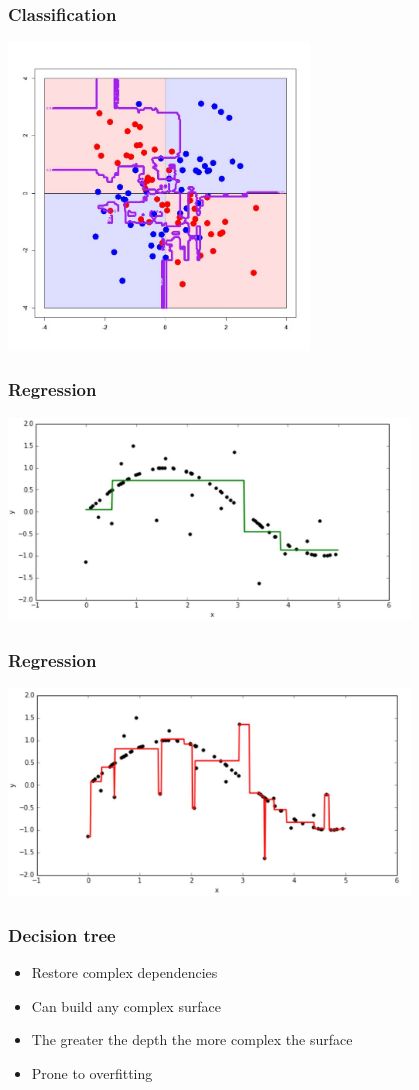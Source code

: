 \documentclass[default]{beamer}
\begin{document}
	\begin{frame}
		\frametitle{Classification}
		\centering
		\includegraphics[width=0.6\textwidth]{trees8.jpg}
	\end{frame}

	\begin{frame}
		\frametitle{Regression}
		\centering
		\includegraphics[width=0.8\textwidth]{trees9.jpg}
	\end{frame}

	\begin{frame}
		\frametitle{Regression}
		\centering
		\includegraphics[width=0.8\textwidth]{trees10.jpg}
	\end{frame}


	\begin{frame}
		\frametitle{Decision tree}
		
		\Large
		\begin{itemize}
			\item Restore complex dependencies
			\item Can build any complex surface
			\item The greater the depth the more complex the surface
			\item Prone to overfitting
		\end{itemize}
	\end{frame}
\end{document}
